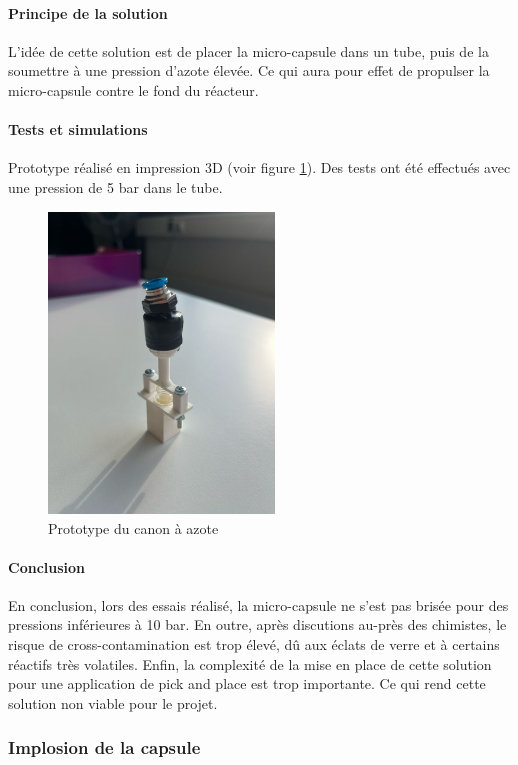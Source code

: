 \paragraph{Principe de la solution}
L'idée de cette solution est de placer la micro-capsule dans un tube, puis de la soumettre à une pression d'azote élevée.
Ce qui aura pour effet de propulser la micro-capsule contre le fond du réacteur.

\paragraph{Tests et simulations}
Prototype réalisé en impression 3D (voir figure \ref{fig:proto_canon}).
Des tests ont été effectués avec une pression de 5 bar dans le tube.

\begin{figure}[H]
    \centering
    \includegraphics[width=6cm]{Images/Illustrations/CDH/Proto_canon.jpg}
    \caption{Prototype du canon à azote}
    \label{fig:proto_canon}
\end{figure}

\paragraph{Conclusion}
En conclusion, lors des essais réalisé, la micro-capsule ne s'est pas brisée pour des pressions inférieures à 10 bar.
En outre, après discutions au-près des chimistes, le risque de cross-contamination est trop élevé, dû aux éclats de verre et à certains réactifs très volatiles.
Enfin, la complexité de la mise en place de cette solution pour une application de pick and place est trop importante. 
Ce qui rend cette solution non viable pour le projet.

\subsubsection{Implosion de la capsule}
